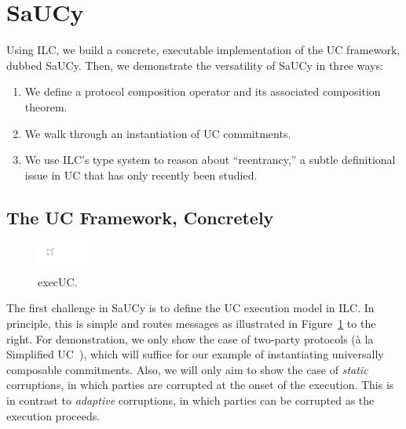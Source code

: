\section{SaUCy}
\label{sec:saucy}

Using ILC, we build a concrete, executable implementation of the UC framework,
dubbed SaUCy. Then, we demonstrate the versatility of SaUCy in three ways:
\begin{enumerate}[leftmargin=*]
\item We define a protocol composition operator and its associated composition theorem.
\item We walk through an instantiation of UC commitments.
\item We use ILC's type system to reason about ``reentrancy,'' a subtle definitional issue in UC that has only recently been studied.
\end{enumerate}



\subsection{The UC Framework, Concretely}
\label{subsec:concrete-uc}

\setlength\intextsep{0pt}
\setlength{\columnsep}{10pt}
\begin{figure}
\centering
\includegraphics[width=0.15\textwidth]{graphics/execUC}
\caption{\textsf{execUC}.}
\label{fig:execUC-diagram}
\end{figure}
The first challenge in SaUCy is to define the UC execution model in ILC.  In
principle, this is simple and routes messages as illustrated in
Figure~\ref{fig:execUC-diagram} to the right. For demonstration, we only show
the case of two-party protocols (\`{a} la Simplified
UC~\cite{canetti2015simpler}), which will suffice for our example of
instantiating universally composable commitments.  Also, we will only aim to
show the case of \emph{static} corruptions, in which parties are corrupted at
the onset of the execution. This is in contrast to \emph{adaptive} corruptions,
in which parties can be corrupted as the execution proceeds.

